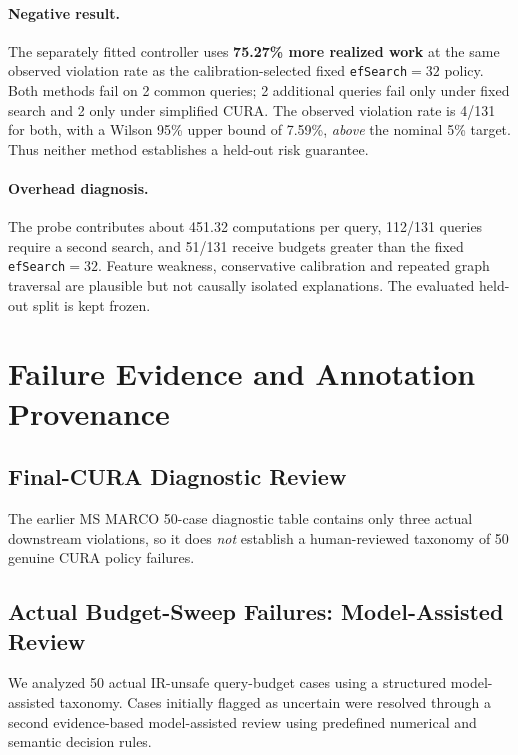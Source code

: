 \documentclass[10pt,twocolumn]{article}
\newcommand{\ef}{\texttt{efSearch}}
\begin{document}
\paragraph{Negative result.} The separately fitted controller uses \textbf{75.27\% more realized work} at the same observed violation rate as the calibration-selected fixed \ef$=32$ policy. Both methods fail on 2 common queries; 2 additional queries fail only under fixed search and 2 only under simplified CURA. The observed violation rate is 4/131 for both, with a Wilson 95\% upper bound of 7.59\%, \emph{above} the nominal 5\% target. Thus neither method establishes a held-out risk guarantee.

\paragraph{Overhead diagnosis.} The probe contributes about 451.32 computations per query, 112/131 queries require a second search, and 51/131 receive budgets greater than the fixed \ef$=32$. Feature weakness, conservative calibration and repeated graph traversal are plausible but not causally isolated explanations. The evaluated held-out split is kept frozen.


\section{Failure Evidence and Annotation Provenance}
\label{sec:manual}
\subsection{Final-CURA Diagnostic Review}

The earlier MS MARCO 50-case diagnostic table contains only three actual downstream violations, so it does \emph{not} establish a human-reviewed taxonomy of 50 genuine CURA policy failures.

\subsection{Actual Budget-Sweep Failures: Model-Assisted Review}
We analyzed 50 actual IR-unsafe query-budget cases using a structured model-assisted taxonomy. Cases initially flagged as uncertain were resolved through a second evidence-based model-assisted review using predefined numerical and semantic decision rules.
\end{document}
